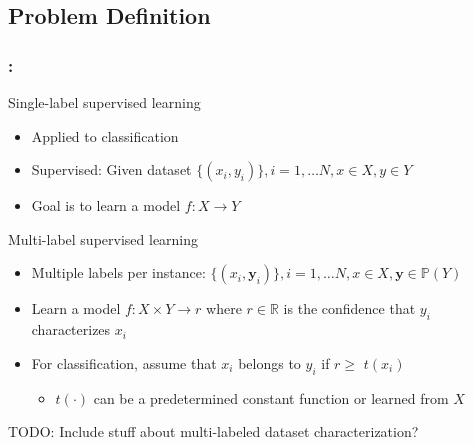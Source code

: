 \documentclass{beamer}
\begin{document}
\subsection{Problem Definition}
\begin{frame}
\frametitle{\insertsection : \insertsubsection}
Single-label supervised learning
\begin{itemize}
	\item Applied to classification
	\item Supervised: Given dataset $\{ (x_i, y_i)\}, i = 1, \dots N, x \in X, y \in Y$
	\item Goal is to learn a model $f: X \rightarrow Y$
\end{itemize}

Multi-label supervised learning
\begin{itemize}
	\item Multiple labels per instance: $\{ (x_i, \bm{y}_i)\}, i = 1, \dots N, x \in X, \bm{y} \in \mathbb{P}(Y)$
	\item Learn a model $f: X \times Y \rightarrow r$ where $r\in \mathbb{R}$ is the confidence that $y_i$ characterizes $x_i$
	\item For classification, assume that $x_i$ belongs to $y_i$ if $r \ge $ $t(x_i)$

		\begin{itemize}
			\item $t(\cdot)$ can be a predetermined constant function or learned from $X$
		\end{itemize}

\end{itemize}
TODO: Include stuff about multi-labeled dataset characterization?
\end{frame}

\end{document}
